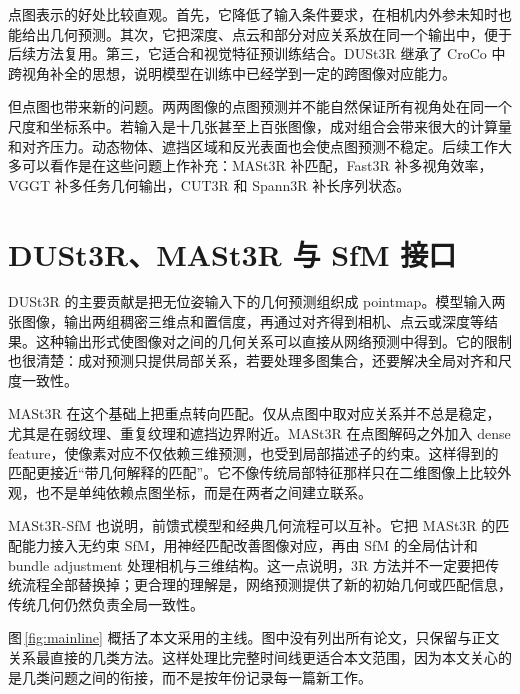 \documentclass[UTF8,a4paper,zihao=-4,fontset=windows]{ctexart}
\begin{document}
点图表示的好处比较直观。首先，它降低了输入条件要求，在相机内外参未知时也能给出几何预测。其次，它把深度、点云和部分对应关系放在同一个输出中，便于后续方法复用。第三，它适合和视觉特征预训练结合。DUSt3R 继承了 CroCo 中跨视角补全的思想，说明模型在训练中已经学到一定的跨图像对应能力\citep{croco}。

但点图也带来新的问题。两两图像的点图预测并不能自然保证所有视角处在同一个尺度和坐标系中。若输入是十几张甚至上百张图像，成对组合会带来很大的计算量和对齐压力。动态物体、遮挡区域和反光表面也会使点图预测不稳定。后续工作大多可以看作是在这些问题上作补充：MASt3R 补匹配，Fast3R 补多视角效率，VGGT 补多任务几何输出，CUT3R 和 Spann3R 补长序列状态。

\section{DUSt3R、MASt3R 与 SfM 接口}

DUSt3R 的主要贡献是把无位姿输入下的几何预测组织成 pointmap。模型输入两张图像，输出两组稠密三维点和置信度，再通过对齐得到相机、点云或深度等结果\citep{dust3r}。这种输出形式使图像对之间的几何关系可以直接从网络预测中得到。它的限制也很清楚：成对预测只提供局部关系，若要处理多图集合，还要解决全局对齐和尺度一致性。

MASt3R 在这个基础上把重点转向匹配。仅从点图中取对应关系并不总是稳定，尤其是在弱纹理、重复纹理和遮挡边界附近。MASt3R 在点图解码之外加入 dense feature，使像素对应不仅依赖三维预测，也受到局部描述子的约束\citep{mast3r}。这样得到的匹配更接近“带几何解释的匹配”。它不像传统局部特征那样只在二维图像上比较外观，也不是单纯依赖点图坐标，而是在两者之间建立联系。

MASt3R-SfM 也说明，前馈式模型和经典几何流程可以互补。它把 MASt3R 的匹配能力接入无约束 SfM，用神经匹配改善图像对应，再由 SfM 的全局估计和 bundle adjustment 处理相机与三维结构\citep{mast3r_sfm}。这一点说明，3R 方法并不一定要把传统流程全部替换掉；更合理的理解是，网络预测提供了新的初始几何或匹配信息，传统几何仍然负责全局一致性。

图\,\ref{fig:mainline} 概括了本文采用的主线。图中没有列出所有论文，只保留与正文关系最直接的几类方法。这样处理比完整时间线更适合本文范围，因为本文关心的是几类问题之间的衔接，而不是按年份记录每一篇新工作。
\end{document}
